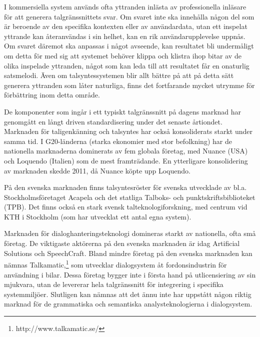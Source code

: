 \begin{multicols}{2}

I kommersiella system används ofta yttranden inlästa av professionella
inläsare för att generera talgränssnittets svar. Om svaret inte ska
innehålla någon del som är beroende av den specifika kontexten eller
av användardata, utan ett inspelat yttrande kan återanvändas i sin
helhet, kan en rik användarupplevelse uppnås. Om svaret däremot ska
anpassas i något avseende, kan resultatet bli undermåligt om detta för
med sig att systemet behöver klippa och klistra ihop bitar av de olika
inspelade yttranden, något som kan leda till att resultatet får en
onaturlig satsmelodi. Även om talsyntessystemen blir allt bättre på
att på detta sätt generera yttranden som låter naturliga, finns det
fortfarande mycket utrymme för förbättring inom detta område.

De komponenter som ingår i ett typiskt talgränssnitt på dagens marknad
har genomgått en långt driven standardisering under det senaste
årtiondet. Marknaden för taligenkänning och talsyntes har också
konsoliderats starkt under samma tid. I G20-länderna (starka ekonomier
med stor befolkning) har de nationella marknaderna dominerats av fem
globala företag, med Nuance (USA) och Loquendo (Italien) som de mest
framträdande. En ytterligare konsolidering av marknaden skedde 2011,
då Nuance köpte upp Loquendo.

På den svenska marknaden finns talsyntesröster för svenska utvecklade
av bl.a. Stockholmsföretaget Acapela och det statliga Talboks- och
punktskriftsbiblioteket (TPB). Det finns också en stark svensk
tal\-tekno\-logi\-forsk\-ning, med centrum vid KTH i Stockholm (som
har utvecklat ett antal egna system).

Marknaden för dialoghanteringsteknologi domineras starkt av
nationella, ofta små företag. De viktigaste aktörerna på den svenska
marknaden är idag Artificial Solutions och SpeechCraft. Bland mindre
företag på den svenska marknaden kan nämnas
Talkamatic,\footnote{http://www.talkamatic.se/} som utvecklar
dialogsystem åt fordonsindustrin för användning i bilar. Dessa företag
bygger inte i första hand på utlicensiering av sin mjukvara, utan de
levererar hela talgränssnitt för integrering i specifika
systemmiljöer. Slutligen kan nämnas att det ännu inte har uppstått
någon riktig marknad för de grammatiska och semantiska
analysteknologierna i dialogsystem.


\end{multicols}

